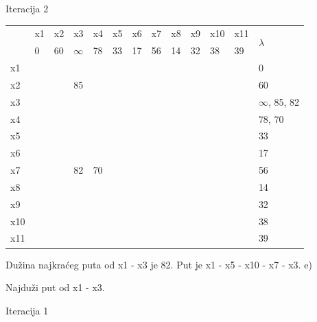 \documentclass[12pt]{article}
\begin{document}
Iteracija 2
\begin{table}[hp]
\centering
\begin{tabular}{|l|l|l|l|l|l|l|l|l|l|l|l|l|}
\hline
\multirow{2}{*}{} & x1 & x2 & x3 & x4 & x5 & x6 & x7 & x8 & x9 & x10 & x11 & \multirow{2}{*}{$\lambda$} \\ \cline{2-12}
 & 0 & 60 & $\infty$ & 78 & 33 & 17 & 56 & 14 & 32 & 38 & 39 &  \\ \hline
x1 &  &  &  &  &  &  &  &  &  &  &  & 0 \\ \hline
x2 &  &  & 85 &  &  &  &  &  &  &  &  & 60 \\ \hline
x3 &  &  &  &  &  &  &  &  &  &  &  & $\infty$, 85, 82 \\ \hline
x4 &  &  &  &  &  &  &  &  &  &  &  & 78, 70 \\ \hline
x5 &  &  &  &  &  &  &  &  &  &  &  & 33 \\ \hline
x6 &  &  &  &  &  &  &  &  &  &  &  & 17 \\ \hline
x7 &  &  & 82 & 70 &  &  &  &  &  &  &  & 56 \\ \hline
x8 &  &  &  &  &  &  &  &  &  &  &  & 14 \\ \hline
x9 &  &  &  &  &  &  &  &  &  &  &  & 32 \\ \hline
x10 &  &  &  &  &  &  &  &  &  &  &  & 38 \\ \hline
x11 &  &  &  &  &  &  &  &  &  &  &  & 39 \\ \hline
\end{tabular}
\end{table}

Dužina najkraćeg puta od x1 - x3 je 82. Put je x1 - x5 - x10 - x7 - x3.
\newpage
e)

Najduži put od x1 - x3.

Iteracija 1
\end{document}
